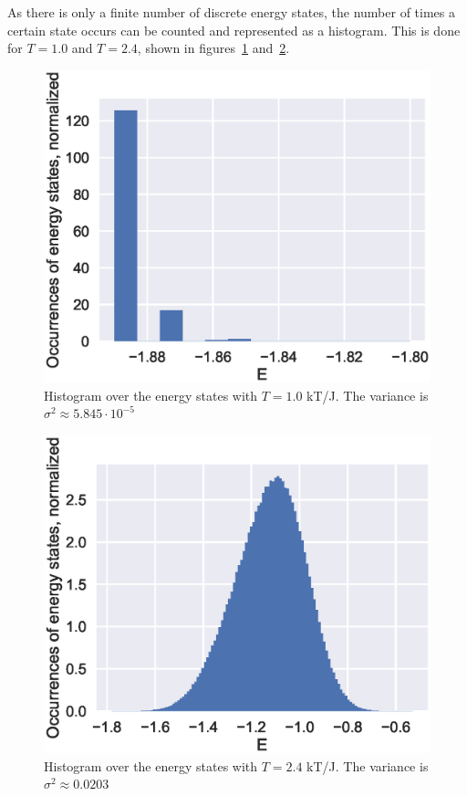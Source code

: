\documentclass[aps,reprint]{revtex4-1}
\begin{document}
As there is only a finite number of discrete energy states, the number of
times a certain state occurs can be counted and represented as a histogram. This
is done for \(T=1.0\) and \(T=2.4\), shown in figures~\ref{fig:4da}
and~\ref{fig:4db}.
\begin{figure}[H]
  \centering
  \includegraphics[width=\columnwidth]{figures/4da.eps}
  \caption{\label{fig:4da} Histogram over the energy states with \(T=1.0\) kT/J.
  The variance is \(\sigma^{2} \approx 5.845\cdot 10^{-5}\)}
\end{figure}

\begin{figure}[H]
  \centering
  \includegraphics[width=\columnwidth]{figures/4db.eps}
  \caption{\label{fig:4db} Histogram over the energy states with \(T=2.4\) kT/J.
  The variance is \(\sigma^{2} \approx 0.0203\)}
\end{figure}
\end{document}
